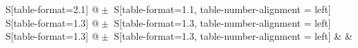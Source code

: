 \begin{table}
    \centering
    \caption{Messdaten der Metallprobe.}
    \label{table:A1}
    \begin{tabular}{
	S[table-format=2.1]
	@{${}\pm{}$}
	S[table-format=1.1, table-number-alignment = left]
	S[table-format=1.3]
	@{${}\pm{}$}
	S[table-format=1.3, table-number-alignment = left]
	S[table-format=1.3]
	@{${}\pm{}$}
	S[table-format=1.3, table-number-alignment = left]
	}
	\toprule
			& 		& 
			\\ 
	\midrule
    
    \bottomrule
    \end{tabular}
    \end{table}
